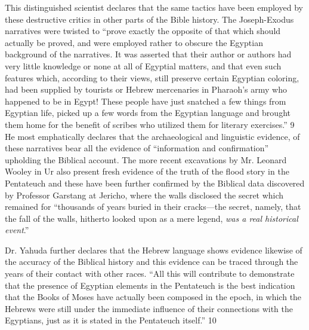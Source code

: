 This distinguished scientist declares that the same tactics have been employed by these
destructive critics in other parts of the Bible history. The Joseph-Exodus narratives were
twisted to ``prove exactly the opposite of that which should actually be proved, and were
employed rather to obscure the Egyptian background of the narratives. It was asserted that
their author or authors had very little knowledge or none at all of Egyptial matters, and that
even such features which, according to their views, still preserve certain Egyptian coloring,
had been supplied by tourists or Hebrew mercenaries in Pharaoh's army who happened to be
in Egypt! These people have just snatched a few things from Egyptian life, picked up a few
words from the Egyptian language and brought them home for the benefit of scribes who
utilized them for literary exercises.'' 9 He most emphatically declares that the archaeological
and linguistic evidence, of these narratives bear all the evidence of ``information and
confirmation'' upholding the Biblical account. The more recent excavations by Mr. Leonard
Wooley in Ur also present fresh evidence of the truth of the flood story in the Pentateuch and
these have been further confirmed by the Biblical data discovered by Professor Garstang at
Jericho, where the walls disclosed the secret which remained for ``thousands of years buried
in their cracks—the secret, namely, that the fall of the walls, hitherto looked upon as a mere
legend, \textit{was a real historical event}.''

Dr. Yahuda further declares that the Hebrew language shows evidence likewise of the
accuracy of the Biblical history and this evidence can be traced through the years of their
contact with other races. ``All this will contribute to demonstrate that the presence of
Egyptian elements in the Pentateuch is the best indication that the Books of Moses have
actually been composed in the epoch, in which the Hebrews were still under the immediate
influence of their connections with the Egyptians, just as it is stated in the Pentateuch itself.''
10

